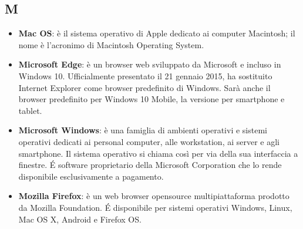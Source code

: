 \subsection{M}
\begin{itemize} 
	\item
	\textbf{Mac OS}: è il sistema operativo di Apple dedicato ai computer Macintosh; il nome è l'acronimo di Macintosh Operating System.
	\item
	\textbf{Microsoft Edge}: è un browser web sviluppato da Microsoft e incluso in Windows 10. Ufficialmente presentato il 21 gennaio 2015, ha sostituito Internet Explorer come browser predefinito di Windows. Sarà anche il browser predefinito per Windows 10 Mobile, la versione per smartphone e tablet.
	\item
	\textbf{Microsoft Windows}: è una famiglia di ambienti operativi e sistemi operativi dedicati ai personal computer, alle workstation, ai server e agli smartphone. Il sistema operativo si chiama così per via della sua interfaccia a finestre.
	\'E software proprietario della Microsoft Corporation che lo rende disponibile esclusivamente a pagamento.
	\item 
	\textbf{Mozilla Firefox}: è un web browser opensource multipiattaforma prodotto da Mozilla Foundation. \'E disponibile per sistemi operativi Windows, Linux, Mac OS X, Android e Firefox OS.
\end{itemize}
